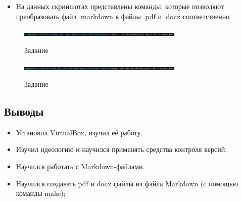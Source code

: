 \begin{itemize}
\tightlist
\item
  На данных скриншотах представлены команды, которые позволяют
  преобразовать файл .markdown в файлы .pdf и .docx соответственно
\end{itemize}

\begin{figure}
\label{fig:005}
\centering
\includegraphics[width=0.7\textwidth,height=\textheight]{image/5.png}
\caption{Задание}\label{fig:005}
\end{figure}

\begin{figure}
\label{fig:006}
\centering
\includegraphics[width=0.7\textwidth,height=\textheight]{image/6.png}
\caption{Задание}\label{fig:006}
\end{figure}

\subsection{Выводы}\label{ux432ux44bux432ux43eux434ux44b}

\begin{itemize}
\tightlist
\item
  Установил VirtualBox, изучил её работу.
\item
  Изучил идеологию и научился применять средства контроля версий.
\item
  Научился работать с Markdown-файлами.
\item
  Научился создавать pdf и docx файлы из файла Markdown (с помощью
  команды make);
\end{itemize}
